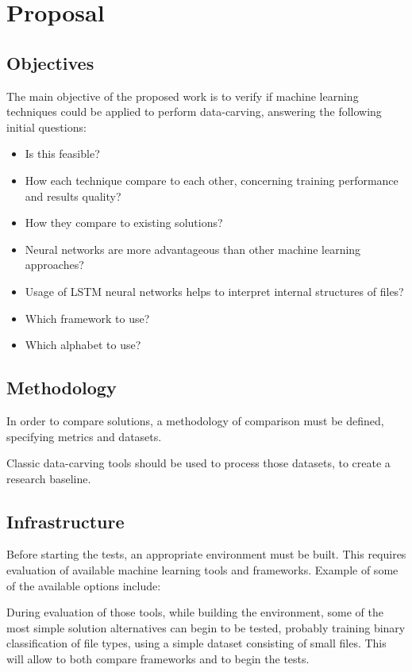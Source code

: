 \chapter{Proposal}
\section{Objectives}
The main objective of the proposed work is to verify if machine learning techniques could be applied to perform data-carving, answering the following initial questions:

\begin{itemize}
  \item Is this feasible?
  \item How each technique compare to each other, concerning training performance and results quality?
  \item How they compare to existing solutions?
  \item Neural networks are more advantageous than other machine learning approaches?
  \item Usage of LSTM neural networks helps to interpret internal structures of files?
  \item Which framework to use?
  \item Which alphabet to use?
\end{itemize}

\section{Methodology}
In order to compare solutions, a methodology of comparison must be defined, specifying metrics and datasets.


Classic data-carving tools should be used to process those datasets, to create a research baseline.

\section{Infrastructure}
Before starting the tests, an appropriate environment must be built. This requires evaluation of available machine learning tools and frameworks. Example of some of the available options include:

During evaluation of those tools, while building the environment, some of the most simple solution alternatives can begin to be tested, probably training binary classification of file types, using a simple dataset consisting of small files. This will allow to both compare frameworks and to begin the tests.


